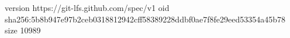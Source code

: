 version https://git-lfs.github.com/spec/v1
oid sha256:5b8b947e97b2ceb0318812942cff58389228ddbf0ae7f8fe29eed53354a45b78
size 10989
